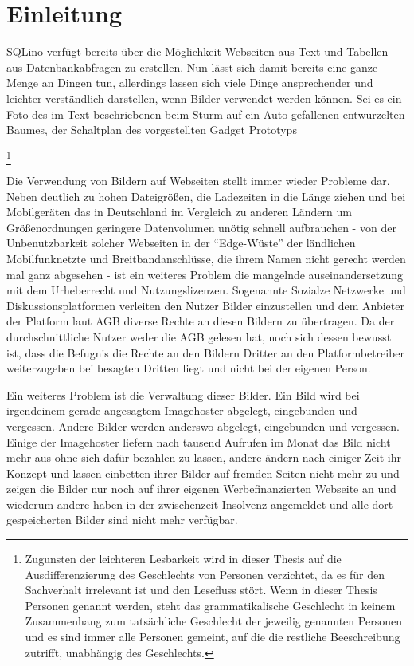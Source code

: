 \section{Einleitung}
\label{sec:introduction}

SQLino verfügt bereits über die Möglichkeit Webseiten aus Text und Tabellen aus
Datenbankabfragen zu erstellen. Nun lässt sich damit bereits eine ganze Menge an
Dingen tun, allerdings lassen sich viele Dinge ansprechender und leichter
verständlich darstellen, wenn Bilder verwendet werden können. Sei es ein Foto
des im Text beschriebenen beim Sturm auf ein Auto gefallenen entwurzelten
Baumes, der Schaltplan des vorgestellten Gadget Prototyps

\footnote{Zugunsten der leichteren Lesbarkeit wird
  in dieser Thesis auf die Ausdifferenzierung des Geschlechts von Personen
  verzichtet, da es für den Sachverhalt irrelevant ist und den Lesefluss stört.
  Wenn in dieser Thesis Personen genannt werden, steht das grammatikalische
  Geschlecht in keinem Zusammenhang zum tatsächliche Geschlecht der jeweilig
  genannten Personen und es sind immer alle Personen gemeint, auf die die
  restliche Beeschreibung zutrifft, unabhängig des Geschlechts.}


Die Verwendung von Bildern auf Webseiten stellt immer wieder Probleme dar. Neben
deutlich zu hohen Dateigrößen, die Ladezeiten in die Länge ziehen und bei
Mobilgeräten das in Deutschland im Vergleich zu anderen Ländern um
Größenordnungen geringere Datenvolumen unötig schnell aufbrauchen - von der
Unbenutzbarkeit solcher Webseiten in der ``Edge-Wüste'' der ländlichen
Mobilfunknetzte und Breitbandanschlüsse, die ihrem Namen nicht gerecht werden
mal ganz abgesehen - ist ein weiteres Problem die mangelnde auseinandersetzung
mit dem Urheberrecht und Nutzungslizenzen. Sogenannte Sozialze Netzwerke und
Diskussionsplatformen verleiten den Nutzer Bilder einzustellen und dem Anbieter der
Platform laut AGB diverse Rechte an diesen Bildern zu übertragen. Da der
durchschnittliche Nutzer weder die AGB gelesen hat, noch sich dessen bewusst
ist, dass die Befugnis die Rechte an den Bildern Dritter an den
Platformbetreiber weiterzugeben bei besagten Dritten liegt und nicht bei der
eigenen Person.

Ein weiteres Problem ist die Verwaltung dieser Bilder. Ein Bild wird bei
irgendeinem gerade angesagtem Imagehoster abgelegt, eingebunden und vergessen.
Andere Bilder werden anderswo abgelegt, eingebunden und vergessen. Einige der
Imagehoster liefern nach tausend Aufrufen im Monat das Bild nicht mehr aus ohne
sich dafür bezahlen zu lassen, andere ändern nach einiger Zeit ihr Konzept und
lassen einbetten ihrer Bilder auf fremden Seiten nicht mehr zu und zeigen die
Bilder nur noch auf ihrer eigenen Werbefinanzierten Webseite an und wiederum
andere haben in der zwischenzeit Insolvenz angemeldet und alle dort
gespeicherten Bilder sind nicht mehr verfügbar.

